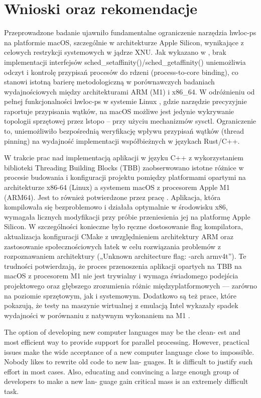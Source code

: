 \chapter{Wnioski oraz rekomendacje}
Przeprowadzone badanie ujawniło fundamentalne ograniczenie narzędzia hwloc-ps na platformie macOS, szczególnie w architekturze Apple Silicon, wynikające z celowych restrykcji systemowych w jądrze XNU. Jak wykazano w \cite{HWLOC555}, brak implementacji interfejsów sched\_setaffinity()/sched\_getaffinity() uniemożliwia odczyt i kontrolę przypisań procesów do rdzeni (process-to-core binding), co stanowi istotną barierę metodologiczną w porównawczych badaniach wydajnościowych między architekturami ARM (M1) i x86\_64. W odróżnieniu od pełnej funkcjonalności hwloc-ps w systemie Linux \cite{hwlocHardwareLocality}, gdzie narzędzie precyzyjnie raportuje przypisania wątków, na macOS możliwe jest jedynie wykrywanie topologii sprzętowej przez lstopo – przy użyciu mechanizmów sysctl. Ograniczenie to, uniemożliwiło bezpośrednią weryfikację wpływu przypisań wątków (thread pinning) na wydajność implementacji współbieżnych w językach Rust/C++.

W trakcie prac nad implementacją aplikacji w języku C++ z wykorzystaniem biblioteki Threading Building Blocks (TBB) zaobserwowano istotne różnice w procesie budowania i konfiguracji projektu pomiędzy platformami opartymi na architekturze x86-64 (Linux) a systemem macOS z procesorem Apple M1 (ARM64). Jest to również potwierdzone przez pracę \cite{ARMTBB}. Aplikacja, która kompilowała się bezproblemowo i działała optymalnie w środowisku x86, wymagała licznych modyfikacji przy próbie przeniesienia jej na platformę Apple Silicon. W szczególności konieczne było ręczne dostosowanie flag kompilatora, aktualizacja konfiguracji CMake z uwzględnieniem architektury ARM oraz zastosowanie społecznościowych łatek w celu rozwiązania problemów z rozpoznawaniem architektury („Unknown architecture flag: -arch armv4t”). Te trudności potwierdzają, że proces przenoszenia aplikacji opartych na TBB na macOS z procesorem M1 nie jest trywialny i wymaga świadomego podejścia projektowego oraz głębszego zrozumienia różnic międzyplatformowych — zarówno na poziomie sprzętowym, jak i systemowym. Dodatkowo są też prace, które pokazują, że testy na maszynie wirtualnej z emulacją Intel wykazały spadek wydajności w porównaniu z natywnym wykonaniem na M1 \cite{TBBARMCONCLUSIONS}.



The option of developing new computer languages may be the clean- est and most efficient way to provide support for parallel processing. However, practical issues make the wide acceptance of a new computer language close to impossible. Nobody likes to rewrite old code to new lan- guages. It is difficult to justify such effort in most cases. Also, educating and convincing a large enough group of developers to make a new lan- guage gain critical mass is an extremely difficult task.
